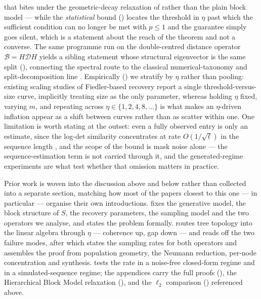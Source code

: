 that bites under the geometric-decay relaxation of  rather than
the plain block model --- while the \emph{statistical} bound
() locates the threshold in $\eta$ past which the
sufficient condition can no longer be met with $p\le1$ and the guarantee
simply goes silent, which is a statement about the reach of the theorem and
not a converse. The same programme run on the double-centred distance
operator $\mathcal B=H\mathcal D H$ yields a sibling statement whose
structural eigenvector is the same split (), connecting
the spectral route to the classical numerical-taxonomy and
split-decomposition line \cite{Griffing2012, BandeltDress1992}. Empirically
() we stratify by $\eta$ rather than pooling: existing
scaling studies of Fiedler-based recovery report a single
threshold-versus-size curve, implicitly treating size as the only parameter,
whereas holding $\eta$ fixed, varying $m$, and repeating across
$\eta\in\{1,2,4,8,\dots\}$ is what makes an $\eta$-driven inflation appear as
a shift between curves rather than as scatter within one. One limitation is
worth stating at the outset: even a fully observed entry is only an estimate,
since the log-det similarity concentrates at rate $O(1/\sqrt\ell)$ in the
sequence length \cite{aizenbud2023spectral}, and the scope of the bound is
mask noise alone --- the sequence-estimation term is not carried through it,
and the generated-regime experiments are what test whether that omission
matters in practice.

Prior work is woven into the discussion above and below rather than
collected into a separate section, matching how most of the papers closest
to this one --- \cite{aizenbud2023spectral} in particular --- organise their
own introductions.  fixes the generative model, the block
structure of $S$, the recovery parameters, the sampling model and the two
operators we analyse, and states the problem formally. 
routes tree topology into the linear algebra through $\eta$ --- coherence up,
gap down --- and reads off the two failure modes, after which 
states the sampling rates for both operators and  assembles
the proof from population geometry, the Neumann reduction, per-node
concentration and synthesis.  tests the rate in a
noise-free closed-form regime and in a simulated-sequence regime; the
appendices carry the full proofs (), the
Hierarchical Block Model relaxation (), and the $\ell_2$
comparison () referenced above.
